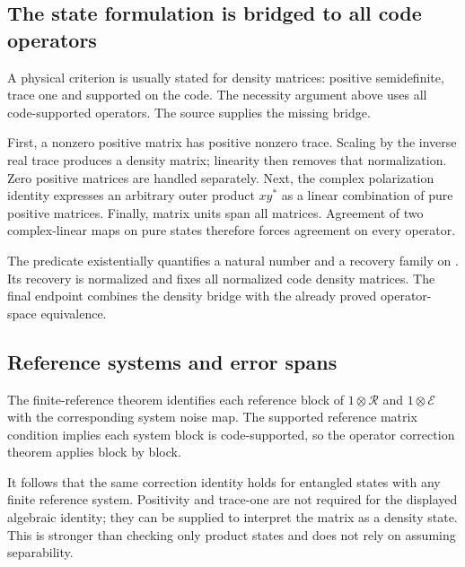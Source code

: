 \subsection{The state formulation is bridged to all code operators}
A physical criterion is usually stated for density matrices: positive semidefinite, trace one and supported on the code. The necessity argument above uses all code-supported operators. The source supplies the missing bridge.

First, a nonzero positive matrix has positive nonzero trace. Scaling by the inverse real trace produces a density matrix; linearity then removes that normalization. Zero positive matrices are handled separately. Next, the complex polarization identity expresses an arbitrary outer product $xy^*$ as a linear combination of pure positive matrices. Finally, matrix units span all matrices. Agreement of two complex-linear maps on pure states therefore forces agreement on every operator.


The predicate  existentially quantifies a natural number and a recovery family on . Its recovery is normalized and fixes all normalized code density matrices. The final endpoint combines the density bridge with the already proved operator-space equivalence.



\subsection{Reference systems and error spans}
The finite-reference theorem identifies each reference block of $1\otimes\mathcal R$ and $1\otimes\mathcal E$ with the corresponding system noise map. The supported reference matrix condition implies each system block is code-supported, so the operator correction theorem applies block by block.


It follows that the same correction identity holds for entangled states with any finite reference system. Positivity and trace-one are not required for the displayed algebraic identity; they can be supplied to interpret the matrix as a density state. This is stronger than checking only product states and does not rely on assuming separability.

